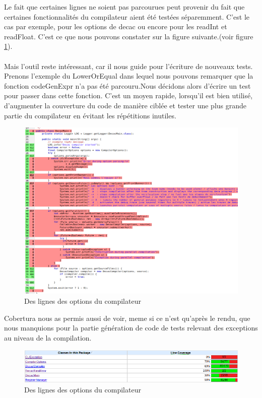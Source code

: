 \documentclass{article}
\begin{document}
Le fait que certaines lignes ne soient pas parcourues
peut provenir du fait que certaines fonctionnalités du compilateur aient été testées séparemment. C'est le cas
par exemple, pour les options de decac ou encore pour les readInt et readFloat.
C'est ce que nous pouvons constater sur la figure suivante.(voir figure \ref{optionsCompil}).
\\\\
Mais l’outil reste intéressant, car il nous guide pour l'écriture
de nouveaux tests. Prenons l’exemple du LowerOrEqual dans lequel
nous pouvons remarquer que la fonction codeGenExpr n’a pas été parcouru.Nous décidons alors d’écrire un test pour passer dans cette fonction. C’est un moyen rapide, lorsqu’il est bien utilisé, d’augmenter
la couverture du code de manière ciblée et tester une plus grande partie du compilateur en évitant les répétitions inutiles.

\begin{figure}[!h]
  \centering
  \includegraphics[scale=0.5]{screensCobertura/screenOptions.png}
  \caption{Des lignes des options du compilateur}
  \label{optionsCompil}
\end{figure}

\newpage
Cobertura nous as permis aussi de voir, meme si ce n'est qu'après le rendu, que nous manquions pour la partie génération de code de tests relevant des exceptions au niveau de la compilation.

\begin{figure}[!h]
  \centering
  \includegraphics[scale=0.6]{screensCobertura/screenExceptions.png}
  \caption{Des lignes des options du compilateur}
  \label{exceptions}
\end{figure}
\newpage
\end{document}
